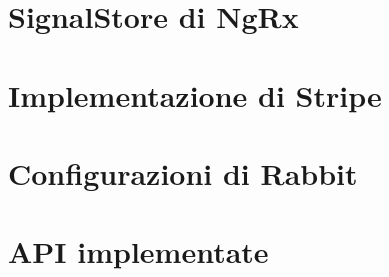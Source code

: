 \section{SignalStore di NgRx}

\section{Implementazione di Stripe}

\section{Configurazioni di Rabbit}

\section{API implementate}
